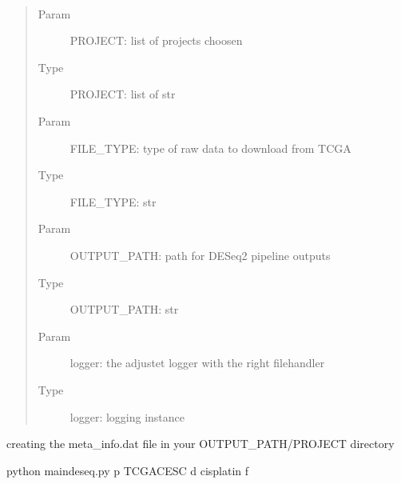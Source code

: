 \documentclass[letterpaper,10pt,english]{sphinxmanual}
\begin{document}

\begin{fulllineitems}
\label{\detokenize{index:create_matrix_new.meta_filter}}~\begin{quote}\begin{description}
\item[{Param}] \leavevmode
\sphinxAtStartPar
PROJECT: list of projects choosen

\item[{Type}] \leavevmode
\sphinxAtStartPar
PROJECT: list of str

\item[{Param}] \leavevmode
\sphinxAtStartPar
FILE\_TYPE: type of raw data to download from TCGA

\item[{Type}] \leavevmode
\sphinxAtStartPar
FILE\_TYPE: str

\item[{Param}] \leavevmode
\sphinxAtStartPar
OUTPUT\_PATH: path for DESeq2 pipeline outputs

\item[{Type}] \leavevmode
\sphinxAtStartPar
OUTPUT\_PATH: str

\item[{Param}] \leavevmode
\sphinxAtStartPar
logger: the adjustet logger with the right filehandler

\item[{Type}] \leavevmode
\sphinxAtStartPar
logger: logging instance

\end{description}\end{quote}

\sphinxAtStartPar
creating the meta\_info.dat file in your OUTPUT\_PATH/PROJECT directory

\def\sphinxLiteralBlockLabel{\label{\detokenize{index:function-1}}}
\begin{sphinxVerbatim}[commandchars=\\\{\}]
\PYGZdl{} python main\PYGZus{}deseq.py \PYGZhy{}p TCGA\PYGZhy{}CESC \PYGZhy{}d cisplatin \PYGZhy{}f 
\end{sphinxVerbatim}

\end{fulllineitems}
\end{document}
